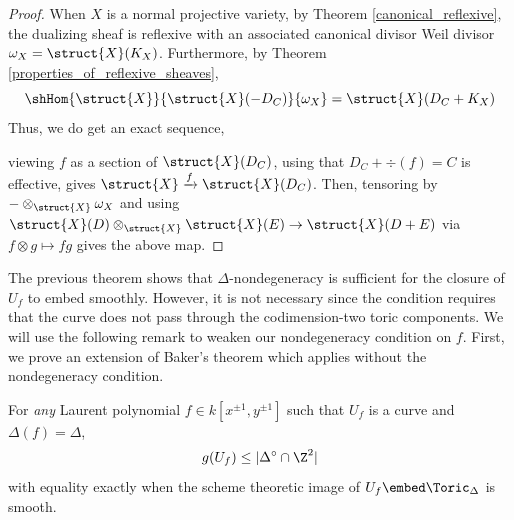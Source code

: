 \begin{proof}
When $X$ is a normal projective variety, by Theorem \ref{canonical_reflexive}, the dualizing sheaf is reflexive with an associated canonical divisor Weil divisor $\omega_X = \struct{X}(K_X)$. Furthermore, by Theorem \ref{properties_of_reflexive_sheaves},
\[ \shHom{\struct{X}}{\struct{X}(-D_C)}{\omega_X} = \struct{X}(D_C + K_X) \]
Thus, we do get an exact sequence,
\begin{center}
\end{center}
viewing $f$ as a section of $\struct{X}(D_C)$, using that $D_C + \div{(f)} = C$ is effective, gives $\struct{X} \xrightarrow{f} \struct{X}(D_C)$. Then, tensoring by $- \otimes_{\struct{X}} \omega_X$ and using $\struct{X}(D) \otimes_{\struct{X}} \struct{X}(E) \to \struct{X}(D + E)$ via $f \otimes g \mapsto fg$ gives the above map.
\end{proof}

\noindent
The previous theorem shows that $\Delta$-nondegeneracy is sufficient for the closure of $U_f$ to embed smoothly. However, it is not necessary since the condition requires that the curve does not pass through the codimension-two toric components. We will use the following remark to weaken our nondegeneracy condition on $f$. First, we prove an extension of Baker's theorem which applies without the nondegeneracy condition.

\begin{thm} \label{baker_refinement}
For \textit{any} Laurent polynomial $f \in k[x^{\pm 1}, y^{\pm 1}]$ such that $U_f$ is a curve and $\Delta(f) = \Delta$,
\[ g(U_f) \le | \Delta^\circ \cap \Z^2 | \]
with equality exactly when the scheme theoretic image of $U_f \embed \Toric_\Delta$ is smooth. 
\end{thm}

